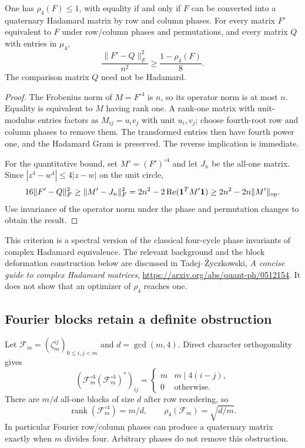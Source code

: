 \begin{theorem}
\label{quat:phase-defect}
One has $\rho_4(F)\le1$, with equality if and only if $F$ can be
converted into a quaternary Hadamard matrix by row and column phases.
For every matrix $F'$ equivalent to $F$ under row/column phases and
permutations, and every matrix $Q$ with entries in $\mu_4$,
\[
              \frac{\|F'-Q\|_F^2}{n^2}
                    \ge\frac{1-\rho_4(F)}8.
\]
The comparison matrix $Q$ need not be Hadamard.
\end{theorem}
\begin{proof}
The Frobenius norm of $M=F^{\circ4}$ is $n$, so its operator norm
is at most $n$. Equality is equivalent to $M$ having rank one.
A rank-one matrix with unit-modulus entries factors as $M_{ij}=u_i v_j$
with unit $u_i,v_j$; choose fourth-root row and column phases to
remove them. The transformed entries then have fourth power one,
and the Hadamard Gram is preserved. The reverse implication is immediate.

For the quantitative bound, set $M'=(F')^{\circ4}$ and let $J_n$
be the all-one matrix. Since $|z^4-w^4|\le4|z-w|$ on the unit circle,
\[
 16\|F'-Q\|_F^2\ge\|M'-J_n\|_F^2
 =2n^2-2\operatorname{Re}(\mathbf1^TM'\mathbf1)
 \ge2n^2-2n\|M'\|_{\rm op}.
\]
Use invariance of the operator norm under the phase and permutation
changes to obtain the result.
\end{proof}

This criterion is a spectral version of the classical four-cycle
phase invariants of complex Hadamard equivalence. The relevant
background and the block deformation construction below are discussed
in Tadej--\.Zyczkowski, \emph{A concise guide to complex Hadamard matrices},
\url{https://arxiv.org/abs/quant-ph/0512154}.
It does not show that an optimizer of $\rho_4$ reaches one.

\subsection{Fourier blocks retain a definite obstruction}
Let $\mathcal F_m=(\zeta_m^{ij})_{0\le i,j<m}$ and $d=\gcd(m,4)$.
Direct character orthogonality gives
\[
 (\mathcal F_m^{\circ4}(\mathcal F_m^{\circ4})^*)_{ij}
 =\begin{cases}m&m\mid4(i-j),\\0&\text{otherwise}.\end{cases}
\]
There are $m/d$ all-one blocks of size $d$ after row reordering, so
\[
 \operatorname{rank}(\mathcal F_m^{\circ4})=m/d,\qquad
 \rho_4(\mathcal F_m)=\sqrt{d/m}.
\]
In particular Fourier row/column phases can produce a quaternary
matrix exactly when $m$ divides four. Arbitrary phases do not remove
this obstruction.


